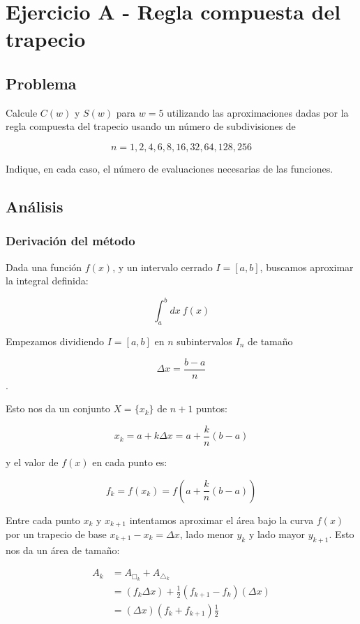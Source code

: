 \section{Ejercicio A - Regla compuesta del trapecio}

\subsection{Problema}

Calcule $C(w)$ y $S(w)$ para $w = 5$ utilizando las aproximaciones dadas por la regla
compuesta del trapecio usando un número de subdivisiones de

$$
n = 1, 2, 4, 6, 8, 16, 32, 64, 128, 256
$$

Indique, en cada caso, el número de evaluaciones necesarias de las funciones.

\subsection{Análisis}

\subsubsection{Derivación del método}

Dada una función $f(x)$, y un intervalo cerrado $I = [a, b]$, buscamos aproximar la integral definida: 

$$\int_{a}^{b} dx ~ f(x) $$


Empezamos dividiendo $I = [a, b]$ en $n$ subintervalos $I_n$ de tamaño 

$$
\Delta x = \frac{b - a} {n}
$$.

Esto nos da un conjunto $ X = \{ x_k \}$ de $n + 1$ puntos: 

$$
x_k = a + k \Delta x  = a + \frac{ k}{n}(b-a)
$$

y el valor de $f(x)$ en cada punto es:

$$
f_k = f(x_k) = f(a + \frac{ k}{n}(b-a) )
$$


Entre cada punto $x_k$ y $x_{k+1}$ intentamos aproximar el área bajo la curva $f(x)$ por un trapecio de base $x_{k+1} - x_k = \Delta x$, lado menor $y_k$ y lado mayor $y_{k+1}$. Esto nos da un área de tamaño:

\begin{align*}
	A_k 
	&= A_{\Box_k} + A_{\triangle_k} \\
	&= (f_k \Delta x ) + \frac{1}{2}(f_{k+1}-f_k)(\Delta x) \\
	&= (\Delta x)( f_k + f_{k+1} )\frac{1}{2}
\end{align*}

